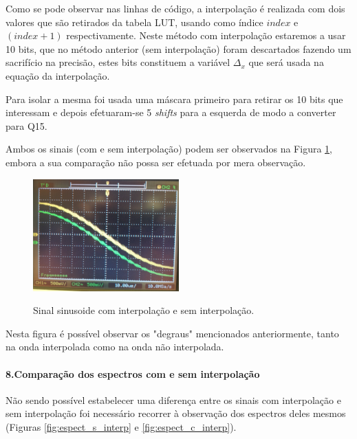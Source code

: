 \documentclass[11pt]{article}
\numberwithin{equation}{section}
\begin{document}
Como se pode observar nas linhas de código, a interpolação é realizada com dois valores que são retirados da tabela LUT, usando como índice $\textit{index}$ \hspace{0,1 mm} e $(\textit{index}+1)$ respectivamente. Neste método com interpolação estaremos a usar 10 bits, que no método anterior (sem interpolação) foram descartados fazendo um sacrifício na precisão,  estes bits constituem a variável $ \Delta_{x} $ que será usada na equação da interpolação.

Para isolar a mesma foi usada uma máscara primeiro para retirar os 10 bits que interessam e depois efetuaram-se 5 \textit{shifts} para a esquerda de modo a converter para Q15.

Ambos os sinais (com e sem interpolação) podem ser observados na Figura \ref{fig:interp}, embora a sua comparação não possa ser efetuada por mera observação.
\begin{figure}[H]
	\centering
	\includegraphics[width=0.5\textwidth]{./P1_interp}~\\
	\caption{Sinal sinusoide com interpolação e sem interpolação.}
	\label{fig:interp}
\end{figure} 
Nesta figura é possível observar os "degraus" mencionados anteriormente, tanto na onda interpolada como na onda não interpolada.

\paragraph{8.Comparação dos espectros com e sem interpolação} \hspace{0pt}

Não sendo possível estabelecer uma diferença entre os sinais com interpolação e sem interpolação foi necessário recorrer à observação dos espectros deles mesmos (Figuras \ref{fig:espect_s_interp} e \ref{fig:espect_c_interp}).
\end{document}
